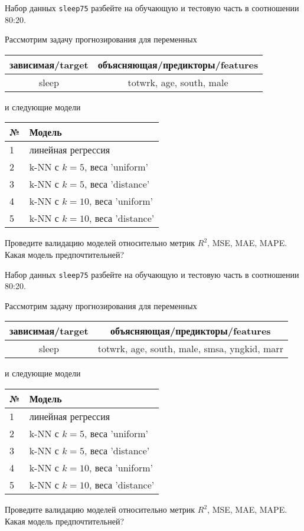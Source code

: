 \begin{exercise}
Набор данных \texttt{sleep75} разбейте на обучающую и тестовую часть
в соотношении 80:20.

Рассмотрим задачу прогнозирования для переменных
\begin{center}
	\begin{tabular}{|c|c|}\hline
		зависимая/target & объясняющая/предикторы/features \\ \hline
		sleep & totwrk, age, south, male \\ \hline
	\end{tabular}
\end{center}
и следующие модели
\begin{center}
	\begin{tabular}{|l|l|}\hline
		№ & Модель \\ \hline
		1 & линейная регрессия\\
		2 & k-NN с \(k=5\), веса 'uniform' \\
		3 & k-NN с \(k=5\), веса 'distance' \\
		4 & k-NN с \(k=10\), веса 'uniform' \\
		5 & k-NN с \(k=10\), веса 'distance' \\ \hline
	\end{tabular}
\end{center}
Проведите валидацию моделей относительно метрик \(R^2\), MSE, MAE,
MAPE. Какая модель предпочтительней?
\end{exercise}

\begin{exercise}
Набор данных \texttt{sleep75} разбейте на обучающую и тестовую часть
в соотношении 80:20.

Рассмотрим задачу прогнозирования для переменных
\begin{center}
	\begin{tabular}{|c|c|}\hline
		зависимая/target & объясняющая/предикторы/features \\ \hline
		sleep & totwrk, age, south, male, smsa, yngkid, marr \\ \hline
	\end{tabular}
\end{center}
и следующие модели
\begin{center}
	\begin{tabular}{|l|l|}\hline
		№ & Модель \\ \hline
		1 & линейная регрессия\\
		2 & k-NN с \(k=5\), веса 'uniform' \\
		3 & k-NN с \(k=5\), веса 'distance' \\
		4 & k-NN с \(k=10\), веса 'uniform' \\
		5 & k-NN с \(k=10\), веса 'distance' \\ \hline
	\end{tabular}
\end{center}
Проведите валидацию моделей относительно метрик \(R^2\), MSE, MAE,
MAPE. Какая модель предпочтительней?
\end{exercise}

